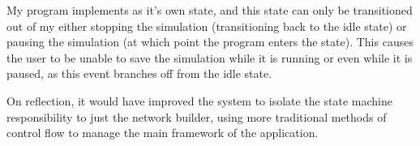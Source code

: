         My program implements  as it's own state, and this state can only be transitioned out of my either stopping the simulation (transitioning back to the idle state) or pausing the simulation (at which point the program enters the  state). This causes the user to be unable to save the simulation while it is running or even while it is paused, as this event branches off from the idle state.

        On reflection, it would have improved the system to isolate the state machine responsibility to just the network builder, using more traditional methods of control flow to manage the main framework of the application.
